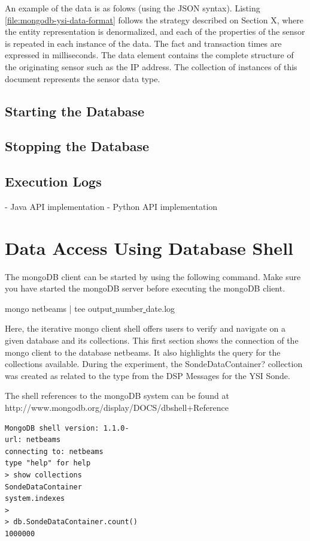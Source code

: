 An example of the data is as folows (using the JSON syntax). Listing
\ref{file:mongodb-ysi-data-format} follows the strategy described on Section X,
where the entity representation is denormalized, and each of the properties of
the sensor is repeated in each instance of the data. The fact and transaction
times are expressed in milliseconds. The data element contains the complete
structure of the originating sensor such as the IP address. The collection of
instances of this document represents the sensor data type.

\subsection{Starting the Database}

\subsection{Stopping the Database}

\subsection{Execution Logs}

- Java API implementation
- Python API implementation

\section{Data Access Using Database Shell}

The mongoDB client can be started by using the following command. Make sure you
have started the mongoDB server before executing the mongoDB client.

mongo netbeams | tee output\underline{ }number\underline{ }date.log

Here, the iterative mongo client shell offers users to verify and navigate on a
given database and its collections. This first section shows the connection of
the mongo client to the database netbeams. It also highlights the query for the
collections available. During the experiment, the SondeDataContainer?
collection was created as related to the type from the DSP Messages for the YSI
Sonde.

The shell references to the mongoDB system can be found at
http://www.mongodb.org/display/DOCS/dbshell+Reference 

\lstset{label=cmd:mongo,caption=Execution of mongo client}
\begin{lstlisting}
MongoDB shell version: 1.1.0-
url: netbeams
connecting to: netbeams
type "help" for help
> show collections
SondeDataContainer
system.indexes
>
> db.SondeDataContainer.count()
1000000
\end{lstlisting}

